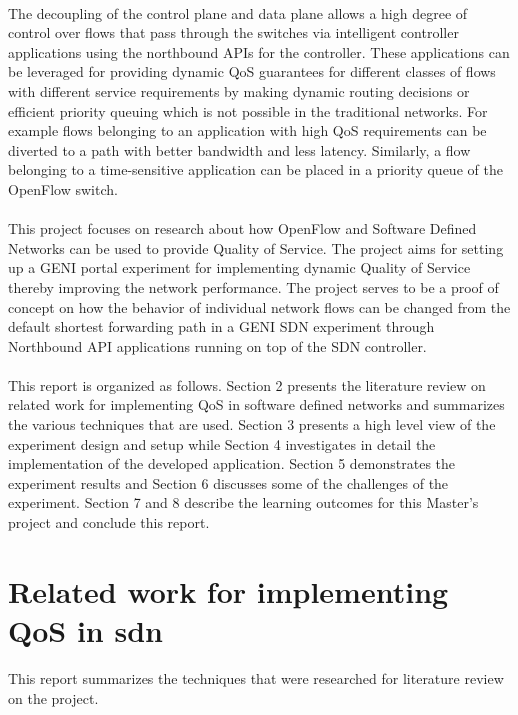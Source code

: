\documentclass[paper=a4, fontsize=12pt]{scrartcl}	%
\numberwithin{equation}{section}		%
\numberwithin{figure}{section}			%
\numberwithin{table}{section}				%
\begin{document}
\\
The decoupling of the control plane and data plane allows a high degree of control over flows that pass through the switches via intelligent controller applications using the northbound APIs for the controller. These applications can be leveraged for providing dynamic QoS guarantees for different classes of flows with different service requirements by making dynamic routing decisions or efficient priority queuing which is not possible in the traditional networks. For example flows belonging to an application with high QoS requirements can be diverted to a path with better bandwidth and less latency. Similarly, a flow belonging to a time-sensitive application can be placed in a priority queue of the OpenFlow switch.
\\
\\
This project focuses on research about how OpenFlow and Software Defined Networks can be used to provide Quality of Service. The project aims for setting up a GENI portal experiment for implementing dynamic Quality of Service thereby improving the network performance. The project serves to be a proof of concept on how the behavior of individual network flows can be changed from the default shortest forwarding path in a GENI SDN experiment through Northbound API applications running on top of the SDN controller.
\\
\\
This report is organized as follows. Section 2 presents the literature review on related work for implementing QoS in software defined networks and summarizes the various techniques that are used. Section 3 presents a high level view of the experiment design and setup while Section 4 investigates in detail the implementation of the developed application. Section 5 demonstrates the experiment results and Section 6 discusses some of the challenges of the experiment. Section 7 and 8 describe the learning outcomes for this Master's project and conclude this report.

\section{Related work for implementing QoS in sdn}
This report summarizes the techniques that were researched for literature review on the project.
\end{document}
